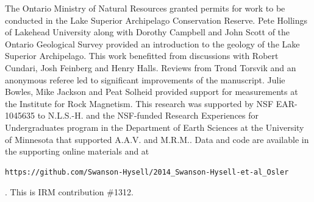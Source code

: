 \documentclass[draft,gc]{AGUTeX}
\begin{document}
\begin{article}

%
%
%
%
%
%
%

\begin{acknowledgments}
The Ontario Ministry of Natural Resources granted permits for work to be conducted in the Lake Superior Archipelago Conservation Reserve. Pete Hollings of Lakehead University along with Dorothy Campbell and John Scott of the Ontario Geological Survey provided an introduction to the geology of the Lake Superior Archipelago. This work benefitted from discussions with Robert Cundari, Josh Feinberg and Henry Halls. Reviews from Trond Torsvik and an anonymous referee led to significant improvements of the manuscript. Julie Bowles, Mike Jackson and Peat Solheid provided support for measurements at the Institute for Rock Magnetism. This research was supported by NSF EAR-1045635 to N.L.S.-H. and the NSF-funded Research Experiences for Undergraduates program in the Department of Earth Sciences at the University of Minnesota that supported A.A.V. and M.R.M.. Data and code are available in the supporting online materials and at \begin{verbatim}https://github.com/Swanson-Hysell/2014_Swanson-Hysell-et-al_Osler\end{verbatim}. This is IRM contribution $\#$1312.


\end{acknowledgments}
\end{article}
\end{document}

